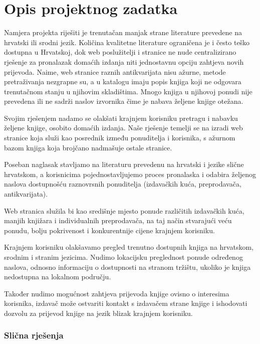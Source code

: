 \chapter{Opis projektnog zadatka}
		
		
		Namjera projekta riješiti je trenutačan manjak strane literature prevedene na hrvatski ili srodni jezik. Količina kvalitetne literature ograničena je i često teško dostupna u Hrvatskoj, dok web poslužitelji i stranice ne nude centralizirano rješenje za pronalazak domaćih izdanja niti jednostavnu opciju zahtjeva novih prijevoda. Naime, web stranice raznih antikvarijata nisu ažurne, metode pretraživanja nezgrapne su, a u katalogu imaju popis knjiga koji ne odgovara trenutačnom stanju u njihovim skladištima. Mnogo knjiga u njihovoj ponudi nije prevedena ili ne sadrži naslov izvornika čime je nabava željene knjige otežana.
		
		Svojim rješenjem nadamo se olakšati krajnjem korisniku pretragu i nabavku željene knjige, osobito domaćih izdanja. Naše rješenje temelji se na izradi web stranice koja služi kao posrednik između ponuditelja i korisnika, s ažurnom bazom knjiga koja brojčano nadmašuje ostale stranice. 
		
		Poseban naglasak stavljamo na literaturu prevedenu na hrvatski i jezike slične hrvatskom, a korisnicima pojednostavljujemo proces pronalaska i odabira željenog naslova dostupnošću raznovrsnih ponuditelja (izdavačkih kuća, preprodavača, antikvarijata).
		
		Web stranica služila bi kao središnje mjesto ponude različitih izdavačkih kuća, manjih knjižara i individualnih preprodavača, na taj način stvarajući veću ponudu, bolju pokrivenost i konkurentnije cijene krajnjem korisniku.
		
		Krajnjem korisniku olakšavamo pregled trenutno dostupnih knjiga na hrvatskom, srodnim i stranim jezicima. Nudimo lokacijsku preglednost ponude određenog naslova, odnosno informaciju o dostupnosti na stranom tržištu, ukoliko je knjiga nedostupna na lokalnom području.
		
		Također nudimo mogućnost zahtjeva prijevoda knjige ovisno o interesima korisnika, izdavač može ostvariti kontakt s izdavačem strane knjige i ishodovati dozvolu za prijevod knjige na jezik blizak krajnjem korisniku.\\
		
		
		
		\subsection*{Slična rješenja}
		
